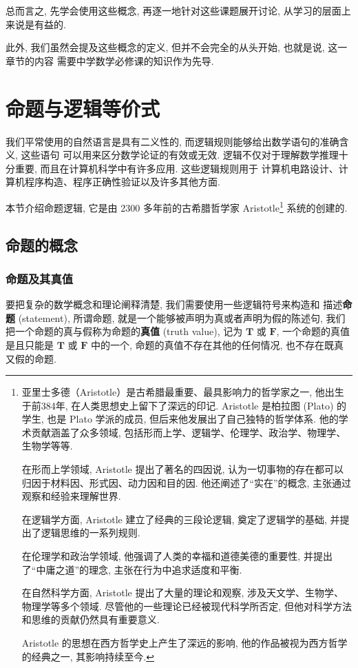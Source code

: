 \documentclass[10pt,UTF8]{book} %
\begin{document}
总而言之, 先学会使用这些概念, 再逐一地针对这些课题展开讨论, 从学习的层面上来说是有益的.

此外, 我们虽然会提及这些概念的定义, 但并不会完全的从头开始, 也就是说, 这一章节的内容
需要中学数学必修课的知识作为先导.

\section{命题与逻辑等价式}

我们平常使用的自然语言是具有二义性的, 而逻辑规则能够给出数学语句的准确含义, 这些语句
可以用来区分数学论证的有效或无效.
逻辑不仅对于理解数学推理十分重要, 而且在计算机科学中有许多应用. 这些逻辑规则用于
计算机电路设计、计算机程序构造、程序正确性验证以及许多其他方面.

本节介绍命题逻辑, 它是由 2300 多年前的古希腊哲学家 Aristotle\footnote{
    亚里士多德（Aristotle）是古希腊最重要、最具影响力的哲学家之一, 他出生于前384年, 在人类思想史上留下了深远的印记.  Aristotle 是柏拉图 (Plato) 的学生, 也是 Plato 学派的成员, 但后来他发展出了自己独特的哲学体系. 他的学术贡献涵盖了众多领域, 包括形而上学、逻辑学、伦理学、政治学、物理学、生物学等等. 

    在形而上学领域,  Aristotle 提出了著名的四因说, 认为一切事物的存在都可以归因于材料因、形式因、动力因和目的因. 他还阐述了“实在”的概念, 主张通过观察和经验来理解世界. 

    在逻辑学方面,  Aristotle 建立了经典的三段论逻辑, 奠定了逻辑学的基础, 并提出了逻辑思维的一系列规则. 

    在伦理学和政治学领域, 他强调了人类的幸福和道德美德的重要性, 并提出了“中庸之道”的理念, 主张在行为中追求适度和平衡. 

    在自然科学方面,  Aristotle 提出了大量的理论和观察, 涉及天文学、生物学、物理学等多个领域. 尽管他的一些理论已经被现代科学所否定, 但他对科学方法和思维的贡献仍然具有重要意义. 

     Aristotle 的思想在西方哲学史上产生了深远的影响, 他的作品被视为西方哲学的经典之一, 其影响持续至今. 
} 系统的创建的.

\subsection{命题的概念}

\subsubsection{命题及其真值}

要把复杂的数学概念和理论阐释清楚, 我们需要使用一些逻辑符号来构造和
描述\textbf{命题} (statement), 所谓命题, 就是一个能够被声明为真或者声明为假的陈述句,
我们把一个命题的真与假称为命题的\textbf{真值} (truth value), 记为 $\mathbf{T}$ 或 
$\mathbf{F}$,
一个命题的真值是且只能是 $\mathbf{T}$ 或 $\mathbf{F}$ 中的一个, 
命题的真值不存在其他的任何情况, 也不存在既真又假的命题.
\end{document}
